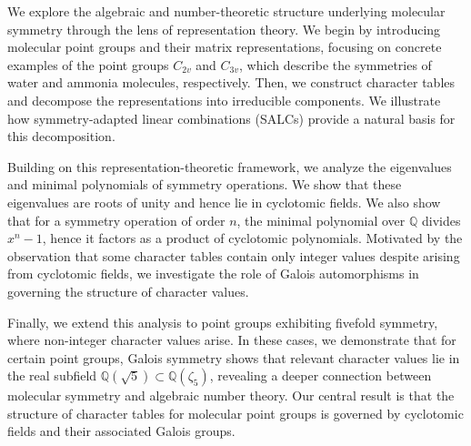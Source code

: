 We explore the algebraic and number-theoretic structure underlying molecular symmetry through the lens of representation theory. We begin by introducing molecular point groups and their matrix representations, focusing on concrete examples of the point groups $C_{2v}$ and $C_{3v}$, which describe the symmetries of water and ammonia molecules, respectively. Then, we construct character tables and decompose the representations into irreducible components. We illustrate how symmetry-adapted linear combinations (SALCs) provide a natural basis for this decomposition.

Building on this representation-theoretic framework, we analyze the eigenvalues and minimal polynomials of symmetry operations. We show that these eigenvalues are roots of unity and hence lie in cyclotomic fields. We also show that for a symmetry operation of order $n$, the minimal polynomial over $\mathbb{Q}$ divides $x^n-1$, hence it factors as a product of cyclotomic polynomials. Motivated by the observation that some character tables contain only integer values despite arising from cyclotomic fields, we investigate the role of Galois automorphisms in governing the structure of character values.

Finally, we extend this analysis to point groups exhibiting fivefold symmetry, where non-integer character values arise. In these cases, we demonstrate that for certain point groups, Galois symmetry shows that relevant character values lie in the real subfield $\mathbb{Q}(\sqrt5)\subset\mathbb{Q}(\zeta_5)$, revealing a deeper connection between molecular symmetry and algebraic number theory. Our central result is that the structure of character tables for molecular point groups is governed by cyclotomic fields and their associated Galois groups.